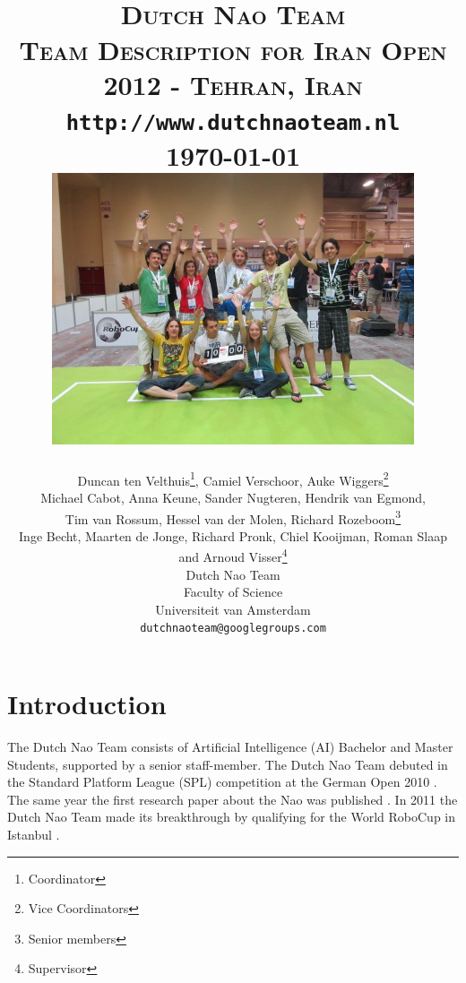 \documentclass[11pt]{article}
\title{
\HRule{0.5pt} \\
\LARGE \textbf{\textsc{Dutch Nao Team}}\\[0.5cm]
\normalsize \textsc{Team Description for Iran Open 2012 - Tehran, Iran}\\
\texttt{http://www.dutchnaoteam.nl}
\normalsize
\HRule{2pt}\\ [0.5cm]
\normalsize
\today\\ [0.5cm]
\includegraphics[width=0.8\textwidth]{team.jpg}
}
\author{
{\small Duncan ten Velthuis\footnote{Coordinator}, Camiel Verschoor, Auke Wiggers\footnote{Vice Coordinators} \\
Michael Cabot, Anna Keune, Sander Nugteren, Hendrik van Egmond, \\
Tim van Rossum, Hessel van der Molen, Richard Rozeboom\footnote{Senior members} \\
Inge Becht, Maarten de Jonge, Richard Pronk,
Chiel Kooijman, Roman Slaap \\
and Arnoud Visser\footnote{Supervisor}}\\ [0.2cm]
Dutch Nao Team\\
Faculty of Science\\
Universiteit van Amsterdam\\
\texttt{dutchnaoteam@googlegroups.com} \\
}
\makeatletter
\def\printtitle{
    {\centering \@title\par}}
\def\printauthor{
    {\centering \large \@author}}
\makeatother
\begin{document}
\thispagestyle{empty}

\printtitle									
\vfill
\printauthor
\newpage
\setcounter{page}{1}
\normalsize
\section{Introduction}
The Dutch Nao Team consists of Artificial Intelligence (AI) Bachelor and Master Students, supported by a senior staff-member.
The Dutch Nao Team debuted in the Standard Platform League (SPL) competition at the German Open 2010 \cite{DutchNaoTeamTDP2010}. The same year the first research paper about the Nao was published \cite{vanDerMey2011}. 
In 2011 the Dutch Nao Team made its breakthrough by qualifying for the World RoboCup in Istanbul \cite{DutchNaoTeamTDP2011}.
\end{document}

